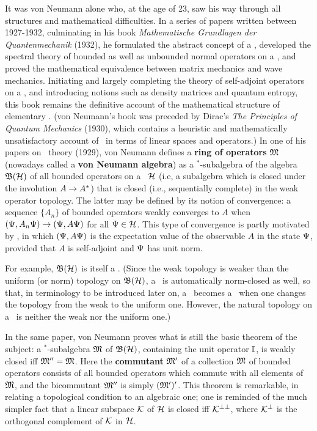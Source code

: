 It was von Neumann alone who, at the age of 23, saw his way through
all structures and mathematical difficulties. In a series of papers
written between 1927-1932, culminating in his book {\em Mathematische
Grundlagen der Quantenmechanik} (1932), he formulated the abstract
concept of a \Hs, developed the spectral theory of bounded as well as
unbounded normal operators on a \Hs, and proved the mathematical
equivalence between matrix mechanics and wave mechanics.  Initiating
and largely completing the theory of self-adjoint operators on a \Hs,
and introducing notions such as density matrices and quantum entropy,
this book remains the definitive account of the mathematical structure
of elementary \qm. (von Neumann's book was preceded by Dirac's {\em
The Principles of Quantum Mechanics} (1930), which contains a
heuristic and mathematically unsatisfactory account of \qm\ in terms
of linear spaces and operators.)   In one of his papers on \Hs\ theory (1929), von Neumann
defines a {\bf ring of operators} ${\frak M}$ (nowadays called a {\bf von
Neumann algebra}) as a $\mbox{}^*$-subalgebra of the algebra ${\frak B}({\cal H})$ of
all bounded operators on a \Hs\ ${\cal H}$ (i.e, a subalgebra which is
closed under the involution $A\rightarrow A^*$) that is closed (i.e.,
sequentially complete) in the weak operator topology.  The latter may
be defined by its notion of convergence: a sequence $\{A_n\}$ of
bounded operators weakly converges to $A$ when $(\Psi,A_n\Psi)\rightarrow
(\Psi,A\Psi)$ for all $\Psi\in{\cal H}$.  This type of convergence is partly
motivated by \qm, in which $(\Psi,A\Psi)$ is the expectation value of
the observable $A$ in the state $\Psi$, provided that $A$ is
self-adjoint and $\Psi$ has unit norm.

For example, ${\frak B}({\cal H})$ is itself a \vNa. (Since the weak topology is
weaker than the uniform (or norm) topology on ${\frak B}({\cal H})$, a \vNa\ is
automatically norm-closed as well, so that, in terminology to be
introduced later on, a \vNa\ becomes a \ca\ when one changes the
topology from the weak to the uniform one. However, the natural
topology on a \vNa\ is neither the weak nor the uniform one.)

In the same paper, von Neumann proves what is still the basic theorem
of the subject: a $\mbox{}^*$-subalgebra ${\frak M}$ of ${\frak B}({\cal H})$, containing the
unit operator ${\Bbb I}$, is weakly closed iff ${\frak M}''={\frak M}$.  Here the {\bf
commutant} ${\frak M}'$ of a collection ${\frak M}$ of bounded operators consists of
all bounded operators which commute with all elements of ${\frak M}$, and the
bicommutant ${\frak M}''$ is simply $({\frak M}')'$.  This theorem is remarkable, in
relating a topological condition to an algebraic one; one is reminded
of the much simpler fact that a linear subspace ${\cal K}$ of ${\cal H}$ is
closed iff ${\cal K}^{\perp\perp}$, where ${\cal K}^{\perp}$ is the orthogonal
complement of ${\cal K}$ in ${\cal H}$.

